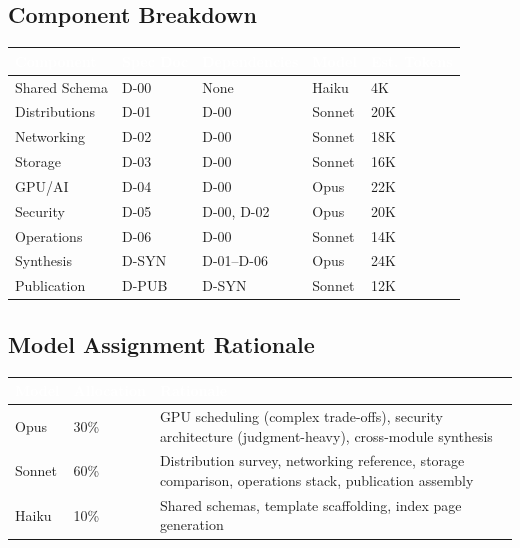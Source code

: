 \documentclass[11pt,letterpaper]{article}
\newcommand{\tableheader}[1]{\textbf{\sffamily\textcolor{white}{#1}}}
\begin{document}
\subsection{Component Breakdown}

\begin{center}
\begin{tabularx}{\textwidth}{L{2.5cm}L{2cm}L{2.5cm}C{1.2cm}C{1.5cm}}
\toprule
{}
\tableheader{Component} & \tableheader{Spec Doc} & \tableheader{Dependencies} & \tableheader{Model} & \tableheader{Est. Tokens} \\
\midrule
Shared Schema & D-00 & None & Haiku & 4K \\
Distributions & D-01 & D-00 & Sonnet & 20K \\
Networking & D-02 & D-00 & Sonnet & 18K \\
Storage & D-03 & D-00 & Sonnet & 16K \\
GPU/AI & D-04 & D-00 & Opus & 22K \\
Security & D-05 & D-00, D-02 & Opus & 20K \\
Operations & D-06 & D-00 & Sonnet & 14K \\
Synthesis & D-SYN & D-01--D-06 & Opus & 24K \\
Publication & D-PUB & D-SYN & Sonnet & 12K \\
\bottomrule
\end{tabularx}
\end{center}

\subsection{Model Assignment Rationale}

\begin{center}
\begin{tabularx}{\textwidth}{C{1.5cm}C{1.5cm}X}
\toprule
{}
\tableheader{Model} & \tableheader{Allocation} & \tableheader{Rationale} \\
\midrule
Opus & 30\% & GPU scheduling (complex trade-offs), security architecture (judgment-heavy), cross-module synthesis \\
Sonnet & 60\% & Distribution survey, networking reference, storage comparison, operations stack, publication assembly \\
Haiku & 10\% & Shared schemas, template scaffolding, index page generation \\
\bottomrule
\end{tabularx}
\end{center}
\end{document}
